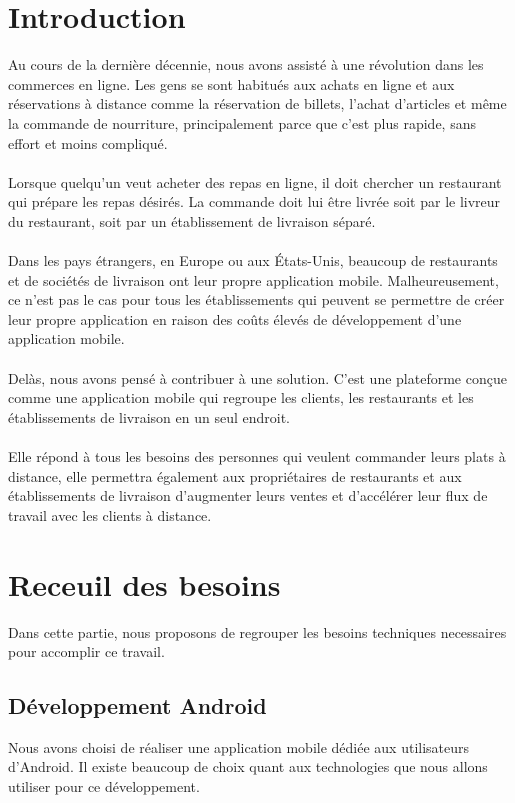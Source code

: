 \documentclass[french, a4paper, 12pt]{report}
\begin{document}
\newpage
\chapter*{Introduction}
    Au cours de la dernière décennie, nous avons assisté à une révolution dans les commerces en ligne. Les gens se sont habitués aux achats en ligne et aux réservations à distance comme la réservation de billets, l'achat d'articles et même la commande de nourriture, principalement parce que c'est plus rapide, sans effort et moins compliqué.\\\\

Lorsque quelqu'un veut acheter des repas en ligne, il doit chercher un restaurant qui prépare les repas désirés. La commande doit lui être livrée soit par le livreur du restaurant, soit par un établissement de livraison séparé.\\\\

Dans les pays étrangers, en Europe ou aux États-Unis, beaucoup de restaurants et de sociétés de livraison ont leur propre application mobile. Malheureusement, ce n'est pas le cas pour tous les établissements qui peuvent se permettre de créer leur propre application en raison des coûts élevés de développement d'une application mobile.\\\\

Delàs, nous avons pensé à contribuer à une solution. C'est une plateforme conçue comme une application mobile qui regroupe les clients, les restaurants et les établissements de livraison en un seul endroit. \\\\

Elle répond à tous les besoins des personnes qui veulent commander leurs plats à distance, elle permettra également aux propriétaires de restaurants et aux établissements de livraison d'augmenter leurs ventes et d'accélérer leur flux de travail avec les clients à distance.


\newpage
\chapter{Receuil des besoins} Dans cette partie, nous proposons de regrouper les besoins techniques necessaires pour accomplir ce travail.
	\section{Développement Android} Nous avons choisi de réaliser une application mobile dédiée aux utilisateurs d'Android. Il existe beaucoup de choix quant aux technologies que nous allons utiliser pour ce développement.
\end{document}
